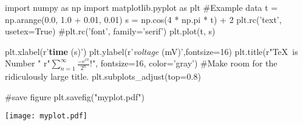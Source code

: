 \documentclass[12pt]{scrartcl}
\begin{document}
\begin{pycode}[pycode]

import numpy as np
import matplotlib.pyplot as plt
#Example data
t = np.arange(0.0, 1.0 + 0.01, 0.01)
s = np.cos(4 * np.pi * t) + 2
plt.rc('text', usetex=True)
#plt.rc('font', family='serif')
plt.plot(t, s)

plt.xlabel(r'\textbf{time} (s)')
plt.ylabel(r'\textit{voltage} (mV)',fontsize=16)
plt.title(r"\TeX\ is Number "
          r"$\displaystyle\sum_{n=1}^\infty\frac{-e^{i\pi}}{2^n}$!",
          fontsize=16, color='gray')
#Make room for the ridiculously large title.
plt.subplots_adjust(top=0.8)

#save figure
plt.savefig("myplot.pdf")
\end{pycode}



\begin{center}
    \texttt{[image: myplot.pdf]}
\end{center}
\end{document}
